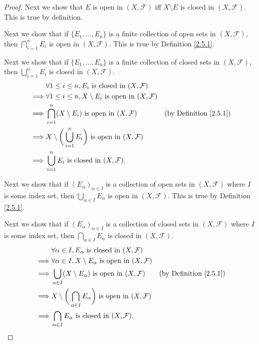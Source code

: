 \begin{proof}
    Next we show that \(E\) is open in \((X, \mathcal{F})\) iff \(X \setminus E\) is closed in \((X, \mathcal{F})\).
    This is true by definition.

    Next we show that if \(\{E_1, \dots, E_n\}\) is a finite collection of open sets in \((X, \mathcal{F})\), then \(\bigcap_{i = 1}^n E_i\) is open in \((X, \mathcal{F})\).
    This is true by Definition \ref{2.5.1}.

    Next we show that if \(\{E_1, \dots, E_n\}\) is a finite collection of closed sets in \((X, \mathcal{F})\), then \(\bigcup_{i = 1}^n E_i\) is closed in \((X, \mathcal{F})\).
    \begin{align*}
                 & \forall 1 \leq i \leq n, E_i \text{ is closed in } (X, \mathcal{F})                                                     \\
        \implies & \forall 1 \leq i \leq n, X \setminus E_i \text{ is open in } (X, \mathcal{F})                                           \\
        \implies & \bigcap_{i = 1}^n (X \setminus E_i) \text{ is open in } (X, \mathcal{F})           & \text{(by Definition \ref{2.5.1})} \\
        \implies & X \setminus \bigg(\bigcup_{i = 1}^n E_i\bigg) \text{ is open in } (X, \mathcal{F})                                      \\
        \implies & \bigcup_{i = 1}^n E_i \text{ is closed in } (X, \mathcal{F}).
    \end{align*}

    Next we show that if \((E_\alpha)_{\alpha \in I}\) is a collection of open sets in \((X, \mathcal{F})\) where \(I\) is some index set, then \(\bigcup_{\alpha \in I} E_\alpha\) is open in \((X, \mathcal{F})\).
    This is true by Definition \ref{2.5.1}.

    Next we show that if \((E_\alpha)_{\alpha \in I}\) is a collection of closed sets in \((X, \mathcal{F})\) where \(I\) is some index set, then \(\bigcap_{\alpha \in I} E_\alpha\) is closed in \((X, \mathcal{F})\).
    \begin{align*}
                 & \forall \alpha \in I, E_\alpha \text{ is closed in } (X, \mathcal{F})                                                             \\
        \implies & \forall \alpha \in I, X \setminus E_\alpha \text{ is open in } (X, \mathcal{F})                                                   \\
        \implies & \bigcup_{\alpha \in I} (X \setminus E_\alpha) \text{ is open in } (X, \mathcal{F})           & \text{(by Definition \ref{2.5.1})} \\
        \implies & X \setminus \bigg(\bigcap_{\alpha \in I} E_\alpha\bigg) \text{ is open in } (X, \mathcal{F})                                      \\
        \implies & \bigcap_{\alpha \in I} E_\alpha \text{ is closed in } (X, \mathcal{F}).
    \end{align*}


\end{proof}
